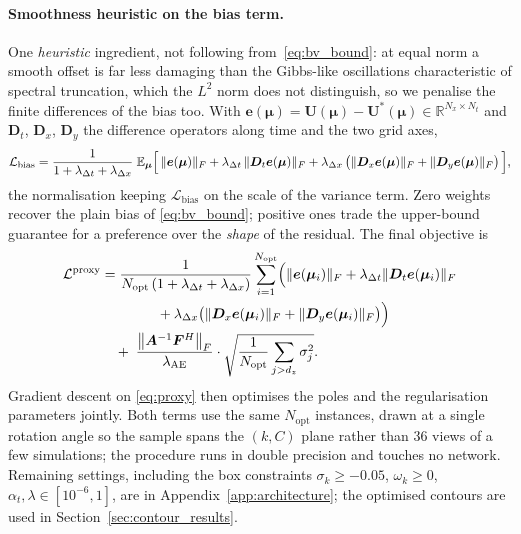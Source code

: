 ﻿\documentclass[a4paper,12pt]{article}
\theoremstyle{definition}
\theoremstyle{remark}
\newcommand{\vmu}{\bm{\mu}}
\newcommand{\R}{\mathbb{R}}
\begin{document}
\paragraph{Smoothness heuristic on the bias term.}
One \emph{heuristic} ingredient, not following from~\eqref{eq:bv_bound}: at equal norm a smooth offset is far less damaging than the Gibbs-like oscillations characteristic of spectral truncation, which the $L^2$ norm does not distinguish, so we penalise the finite differences of the bias too. With $\bm{e}(\vmu) = \bm{U}(\vmu) - \bm{U}^*(\vmu) \in \R^{N_x \times N_t}$ and $\bm{D}_t$, $\bm{D}_x$, $\bm{D}_y$ the difference operators along time and the two grid axes,
\begin{equation}
\label{eq:bias_smooth}
    \mathcal{L}_{\mathrm{bias}} =
    \frac{1}{1 + \lambda_{\Delta t} + \lambda_{\Delta x}}\;
    \mathbb{E}_{\vmu}\Bigl[\,
        \|\bm{e}(\vmu)\|_F
        + \lambda_{\Delta t}\,\|\bm{D}_t\bm{e}(\vmu)\|_F
        + \lambda_{\Delta x}\,\bigl(\|\bm{D}_x\bm{e}(\vmu)\|_F + \|\bm{D}_y\bm{e}(\vmu)\|_F\bigr)
    \,\Bigr],
\end{equation}
the normalisation keeping $\mathcal{L}_{\mathrm{bias}}$ on the scale of the variance term. Zero weights recover the plain bias of \eqref{eq:bv_bound}; positive ones trade the upper-bound guarantee for a preference over the \emph{shape} of the residual. The final objective is
\begin{equation}
\label{eq:proxy}
\begin{aligned}
    \mathcal{L}^{\mathrm{proxy}} &=
    \frac{1}{N_{\mathrm{opt}}\,(1 + \lambda_{\Delta t} + \lambda_{\Delta x})}
    \sum_{i=1}^{N_{\mathrm{opt}}}\Bigl(
        \|\bm{e}(\vmu_i)\|_F
        + \lambda_{\Delta t}\|\bm{D}_t\bm{e}(\vmu_i)\|_F \\
    &\qquad\qquad
        + \lambda_{\Delta x}\bigl(\|\bm{D}_x\bm{e}(\vmu_i)\|_F + \|\bm{D}_y\bm{e}(\vmu_i)\|_F\bigr)
    \Bigr) \\
    &\quad +\;
    \frac{\left\|\bm{A}^{-1}\bm{F}^H\right\|_F}{\lambda_{\mathrm{AE}}}
    \cdot
    \sqrt{\frac{1}{N_{\mathrm{opt}}}\sum_{j > d_z}\sigma_j^2}.
\end{aligned}
\end{equation}
Gradient descent on \eqref{eq:proxy} then optimises the poles and the regularisation parameters jointly. Both terms use the same $N_{\mathrm{opt}}$ instances, drawn at a single rotation angle so the sample spans the $(k, C)$ plane rather than $36$ views of a few simulations; the procedure runs in double precision and touches no network. Remaining settings, including the box constraints $\sigma_k \ge -0.05$, $\omega_k \ge 0$, $\alpha_t, \lambda \in [10^{-6}, 1]$, are in Appendix~\ref{app:architecture}; the optimised contours are used in Section~\ref{sec:contour_results}.
\end{document}
